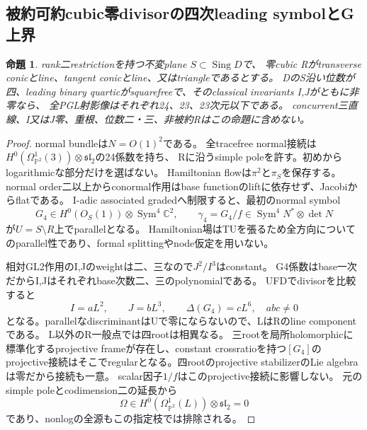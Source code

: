 \documentclass[a4paper,11pt]{ltjsarticle}
\newtheorem{proposition}{命題}[section]
\theoremstyle{definition}
\begin{document}
\subsection{被約可約cubic零divisorの四次leading symbolとG上界}
\begin{proposition}\label{prop:plane-reducible-m4-scalar-G}
rank二restrictionを持つ不変plane $S\subset\operatorname{Sing}D$で、
零cubic Rがtransverse conicとline、tangent conicとline、又はtriangleであるとする。
DのS沿い位数が四、leading binary quarticがsquarefreeで、そのclassical invariants I,Jがともに非零なら、
全PGL射影像はそれぞれ24、23、23次元以下である。
concurrent三直線、I又はJ零、重根、位数二・三、非被約Rはこの命題に含めない。
\end{proposition}
\begin{proof}
normal bundleは$N=O(1)^2$である。
全tracefree normal接続は$H^0(\Omega^1_{\mathbb P^2}(3))\otimes\mathfrak{sl}_2$の24係数を持ち、
Rに沿うsimple poleを許す。初めからlogarithmicな部分だけを選ばない。
Hamiltonian flowは$\pi^2$と$\pi_S$を保存する。
normal order二以上からconormal作用はbase functionのliftに依存せず、Jacobiからflatである。
I-adic associated gradedへ制限すると、最初のnormal symbol
\[
 G_4\in H^0(O_S(1))\otimes\operatorname{Sym}^4\mathbb C^2,\qquad
 \gamma_4=G_4/f\in\operatorname{Sym}^4N^*\otimes\det N
\]
が$U=S\setminus R$上でparallelとなる。
Hamiltonian場はTUを張るため全方向についてのparallel性であり、formal splittingやnode仮定を用いない。

相対GL2作用のI,Jのweightは二、三なので$J^2/I^3$はconstant。
G4係数はbase一次だからI,Jはそれぞれbase次数二、三のpolynomialである。
UFDでdivisorを比較すると
\[
 I=aL^2,\qquad J=bL^3,\qquad\Delta(G_4)=cL^6,\quad abc\ne0
\]
となる。parallelなdiscriminantはUで零にならないので、LはRのline componentである。
L以外のR一般点では四rootは相異なる。
三rootを局所holomorphicに標準化するprojective frameが存在し、constant crossratioを持つ$[G_4]$の
projective接続はそこでregularとなる。四rootのprojective stabilizerのLie algebraは零だから接続も一意。
scalar因子$1/f$はこのprojective接続に影響しない。
元のsimple poleとcodimension二の延長から
\[
 \Omega\in H^0(\Omega^1_{\mathbb P^2}(L))\otimes\mathfrak{sl}_2=0
\]
であり、nonlogの全源もこの指定枝では排除される。


\end{proof}
\end{document}
